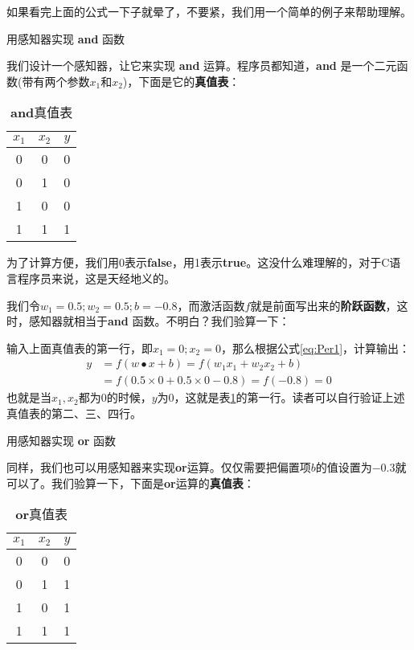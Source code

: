 如果看完上面的公式一下子就晕了，不要紧，我们用一个简单的例子来帮助理解。

\begin{example}
	用感知器实现 \textcolor{main}{\textbf{and}} 函数
\end{example}

我们设计一个感知器，让它来实现 \textcolor{main}{\textbf{and}} 运算。程序员都知道，\textcolor{main}{\textbf{and}} 是一个二元函数(带有两个参数$x_1$和$x_2$)，下面是它的\textbf{真值表}：


\begin{table}[htbp]
	\centering
	\setlength{\tabcolsep}{10mm}
	\caption{\textcolor{main}{\textbf{and}}真值表}
	\begin{tabular}{ccc}
		\hline
		$x_1$ & $x_2$ & $y$ \\ \hline
		0     & 0     & 0   \\
		0     & 1     & 0   \\
		1     & 0     & 0   \\
		1     & 1     & 1   \\ \hline
	\end{tabular}
	\label{tab:Per1}
\end{table}

为了计算方便，我们用0表示\textbf{false}，用1表示\textbf{true}。这没什么难理解的，对于C语言程序员来说，这是天经地义的。

我们令$w_1=0.5;w_2=0.5;b=-0.8$，而激活函数$f$就是前面写出来的\textbf{阶跃函数}，这时，感知器就相当于\textcolor{main}{\textbf{and}} 函数。不明白？我们验算一下：

输入上面真值表的第一行，即$x_1=0;x_2=0$，那么根据公式\ref{eq:Per1}，计算输出：
\begin{align*}
	y & =f(w \bullet x + b) = f(w_1x_1+w_2x_2+b)    \\
	  & =f(0.5\times0+0.5\times0-0.8) = f(-0.8) = 0
\end{align*}
也就是当$x_1, x_2$都为0的时候，$y$为0，这就是表\ref{tab:Per1}的第一行。读者可以自行验证上述真值表的第二、三、四行。

\begin{example}
	用感知器实现 \textcolor{main}{\textbf{or}} 函数
\end{example}

同样，我们也可以用感知器来实现\textcolor{main}{\textbf{or}}运算。仅仅需要把偏置项$b$的值设置为$-0.3$就可以了。我们验算一下，下面是\textcolor{main}{\textbf{or}}运算的\textbf{真值表}：


\begin{table}[htbp]
	\centering
	\setlength{\tabcolsep}{10mm}
	\caption{\textcolor{main}{\textbf{or}}真值表}
	\begin{tabular}{ccc}
		\hline
		$x_1$ & $x_2$ & $y$ \\ \hline
		0     & 0     & 0   \\
		0     & 1     & 1   \\
		1     & 0     & 1   \\
		1     & 1     & 1   \\ \hline
	\end{tabular}
	\label{tab:Per2}
\end{table}


